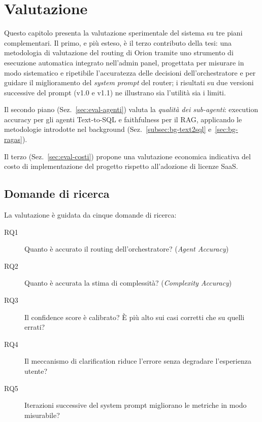 
\chapter{Valutazione}
\label{chap:orion-valutazione}

Questo capitolo presenta la valutazione sperimentale del sistema su tre piani complementari. 
Il primo, e più esteso, è il terzo contributo della tesi: una metodologia di valutazione del routing di Orion tramite uno strumento di esecuzione automatica integrato nell'admin panel, 
progettata per misurare in modo sistematico e ripetibile l'accuratezza delle decisioni dell'orchestratore e per guidare il miglioramento del \emph{system prompt} del router; 
i risultati su due versioni successive del prompt (v1.0 e v1.1) ne illustrano sia l'utilità sia i limiti. 

Il secondo piano (Sez.~\ref{sec:eval-agenti}) valuta la \emph{qualità dei sub-agenti}: execution accuracy per gli agenti Text-to-SQL e faithfulness per il RAG, 
applicando le metodologie introdotte nel background (Sez.~\ref{subsec:bg-text2sql} e~\ref{sec:bg-ragas}). 

Il terzo (Sez.~\ref{sec:eval-costi}) propone una valutazione economica indicativa del costo di implementazione del progetto rispetto
all'adozione di licenze SaaS.

\section{Domande di ricerca}
\label{sec:eval-research-questions}

La valutazione è guidata da cinque domande di ricerca:

\begin{description}
  \item[RQ1] Quanto è accurato il routing dell'orchestratore? (\emph{Agent Accuracy})
  \item[RQ2] Quanto è accurata la stima di complessità? (\emph{Complexity Accuracy})
  \item[RQ3] Il confidence score è calibrato? È più alto sui casi corretti che su quelli errati?
  \item[RQ4] Il meccanismo di clarification riduce l'errore senza degradare l'esperienza utente?
  \item[RQ5] Iterazioni successive del system prompt migliorano le metriche in modo misurabile?
\end{description}


